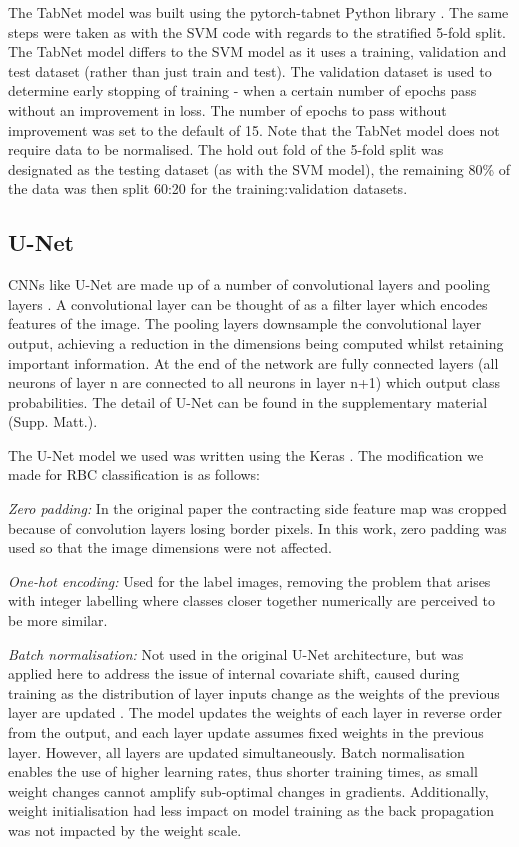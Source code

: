 \documentclass[final,5p,times,twocolumn,authoryear]{elsarticle}
\begin{document}
The TabNet model was built using the pytorch-tabnet Python library \citep{Dreamquark-ai2019Tabnet}. The same steps were taken as with the SVM code with regards to the stratified 5-fold split. The TabNet model differs to the SVM model as it uses a training, validation and test dataset (rather than just train and test). The validation dataset is used to determine early stopping of training - when a certain number of epochs pass without an improvement in loss. The number of epochs to pass without improvement was set to the default of 15. Note that the TabNet model does not require data to be normalised. The hold out fold of the 5-fold split was designated as the testing dataset (as with the SVM model), the remaining 80\% of the data was then split 60:20 for the training:validation datasets. 



\subsection{U-Net}
\label{sec:unetmethod}


CNNs like U-Net are made up of a number of convolutional layers and pooling layers \citep{Gupta2019DeepReview}. A convolutional layer can be thought of as a filter layer which encodes features of the image. The pooling layers downsample the convolutional layer output, achieving a reduction in the dimensions being computed whilst retaining important information. At the end of the network are fully connected layers (all neurons of layer n are connected to all neurons in layer n+1) which output class probabilities.
The detail of U-Net can be found in the supplementary material (Supp. Matt.).

The U-Net model we used was written using the Keras \citep{Chollet2015Keras}. The modification we made for RBC classification is as follows:

  \textit{Zero padding:} In the original paper the contracting side feature map was cropped because of convolution layers losing border pixels. In this work, zero padding was used so that the image dimensions were not affected.
  
  \textit{One-hot encoding: } Used for the label images, removing the problem that arises with integer labelling where classes closer together numerically are perceived to be more similar.
  
  \textit{Batch normalisation: } Not used in the original U-Net architecture, but was applied here to address the issue of internal covariate shift, caused during training as the distribution of layer inputs change as the weights of the previous layer are updated \citep{Ioffe2015BatchShift}. The model updates the weights of each layer in reverse order from the output, and each layer update assumes fixed weights in the previous layer. However, all layers are updated simultaneously. Batch normalisation enables the use of higher learning rates, thus shorter training times, as small weight changes cannot amplify sub-optimal changes in gradients. Additionally, weight initialisation had less impact on model training as the back propagation was not impacted by the weight scale.
  
\end{document}
